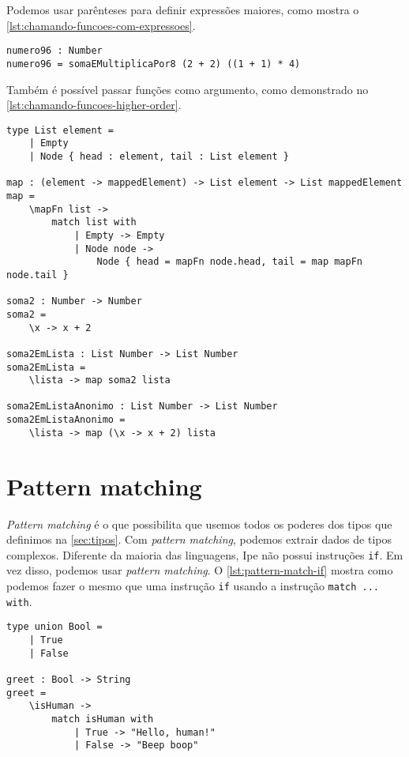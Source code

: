 Podemos usar parênteses para definir expressões maiores, como mostra o
\autoref{lst:chamando-funcoes-com-expressoes}.

\begin{lstlisting}[label={lst:chamando-funcoes-com-expressoes},caption={Exemplo de como chamar uma função com uma expressões maiores}]
numero96 : Number
numero96 = somaEMultiplicaPor8 (2 + 2) ((1 + 1) * 4)
\end{lstlisting}

Também é possível passar funções como argumento, como demonstrado no \autoref{lst:chamando-funcoes-higher-order}.

\begin{lstlisting}[label={lst:chamando-funcoes-higher-order},caption={Exemplo de como passar uma função como argumento}]
type List element =
    | Empty
    | Node { head : element, tail : List element }

map : (element -> mappedElement) -> List element -> List mappedElement
map =
    \mapFn list ->
        match list with
            | Empty -> Empty
            | Node node ->
                Node { head = mapFn node.head, tail = map mapFn node.tail }

soma2 : Number -> Number
soma2 =
    \x -> x + 2

soma2EmLista : List Number -> List Number
soma2EmLista =
    \lista -> map soma2 lista

soma2EmListaAnonimo : List Number -> List Number
soma2EmListaAnonimo =
    \lista -> map (\x -> x + 2) lista
\end{lstlisting}


\section{Pattern matching}\label{sec:pattern-matching}

\textit{Pattern matching} é o que possibilita que usemos todos os poderes dos
tipos que definimos na \autoref{sec:tipos}. Com \textit{pattern matching}, podemos
extrair dados de tipos complexos. Diferente da maioria das linguagens, Ipe não
possui instruções \texttt{if}. Em vez disso, podemos usar \textit{pattern matching}.
O \autoref{lst:pattern-match-if} mostra como podemos fazer o mesmo que uma
instrução \texttt{if} usando a instrução \texttt{match ... with}.


\begin{lstlisting}[label={lst:pattern-match-if},caption={Substituto de if usando \textit{pattern matching}}]
type union Bool =
    | True
    | False

greet : Bool -> String
greet =
    \isHuman ->
        match isHuman with
            | True -> "Hello, human!"
            | False -> "Beep boop"
\end{lstlisting}

